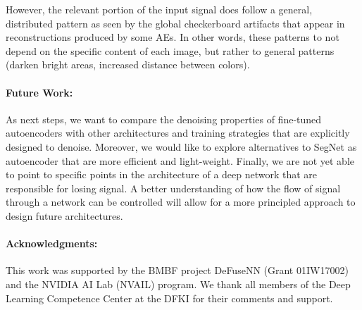 \documentclass[10pt,twocolumn,a4paper]{article}
\begin{document}
However, the relevant portion of the input signal does follow a general, distributed pattern as seen by the global checkerboard artifacts that appear in reconstructions produced by some AEs. In other words, these patterns to not depend on the specific content of each image, but rather to general patterns (\eg darken bright areas, increased distance between colors).

\vspace{-1.5em}\paragraph{Future Work:}
As next steps, we want to compare the denoising properties of fine-tuned autoencoders with other architectures and training strategies that are explicitly designed to denoise.
Moreover, we would like to explore alternatives to SegNet as autoencoder that are more efficient and light-weight.
Finally, we are not yet able to point to specific points in the architecture of a deep network that are responsible for losing signal.
A better understanding of how the flow of signal through a network can be controlled will allow for a more principled approach to design future architectures.


\paragraph{Acknowledgments: }This work was supported by the BMBF project DeFuseNN (Grant 01IW17002) and the NVIDIA AI Lab (NVAIL) program.
We thank all members of the Deep Learning Competence Center at the DFKI for their comments and support.


{\small


}
\end{document}
